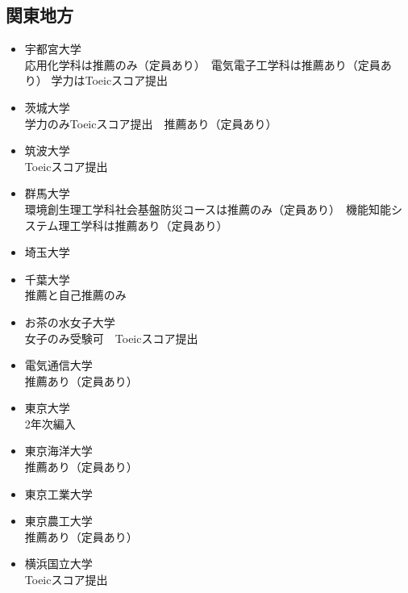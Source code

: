\documentclass[platex, dvipdfmx, a4paper]{jarticle}
\begin{document}
      \subsection{関東地方}
        \begin{itemize}
          \item 宇都宮大学
            \\応用化学科は推薦のみ（定員あり）　電気電子工学科は推薦あり（定員あり）
            学力はToeicスコア提出
          \item 茨城大学
            \\学力のみToeicスコア提出　推薦あり（定員あり）
          \item 筑波大学
            \\Toeicスコア提出
          \item 群馬大学
            \\環境創生理工学科社会基盤防災コースは推薦のみ（定員あり）　機能知能システム理工学科は推薦あり（定員あり）
          \item 埼玉大学
          \item 千葉大学
            \\推薦と自己推薦のみ
          \item お茶の水女子大学
            \\女子のみ受験可　Toeicスコア提出
          \item 電気通信大学
            \\推薦あり（定員あり）
          \item 東京大学
            \\2年次編入
          \item 東京海洋大学
            \\推薦あり（定員あり）
          \item 東京工業大学
          \item 東京農工大学
            \\推薦あり（定員あり）
          \item 横浜国立大学
            \\Toeicスコア提出
        \end{itemize}
\end{document}
